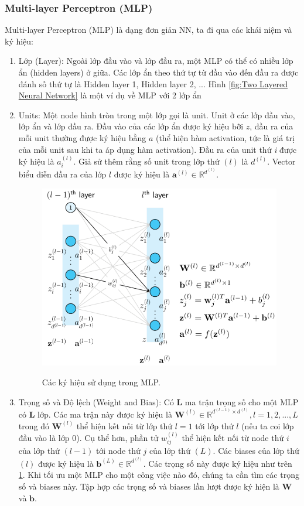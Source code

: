 \subsubsection{Multi-layer Perceptron (MLP)}
Multi-layer Perceptron (MLP) là dạng đơn giản NN, ta đi qua các khái niệm và ký hiệu:
\begin{enumerate}
	\item Lớp (Layer): Ngoài lớp đầu vào và lớp đầu ra, một MLP có thể có nhiều lớp ẩn (hidden layers) ở giữa. Các lớp ẩn theo thứ tự từ đầu vào đến đầu ra được đánh số thứ tự là Hidden layer 1, Hidden layer 2, ... Hình \eqref{fig:Two Layered Neural Network} là một ví dụ về MLP với 2 lớp ẩn
	\item Units: Một node hình tròn trong một lớp gọi là unit. Unit ở các lớp đầu vào, lớp ẩn và lớp đầu ra. Đầu vào của các lớp ẩn được ký hiệu bỡi $\textit{z}$, đầu ra của mỗi unit thường được ký hiệu bằng $\textit{a}$ (thể hiện hàm activation, tức là giá trị của mỗi unit sau khi ta áp dụng hàm activation). Đầu ra của unit thứ \textit{i} được ký hiệu là $a_{i}^{(l)}$. Giả sử thêm rằng số unit trong lớp thứ $(l)$ là $d^{(l)}$. Vector biểu diễn đầu ra của lớp $l$ được ký hiệu là $\textbf{a}^{(l)}\in \mathbb{R}^{d^{(l)}}$.
	\begin{figure}[h]
		\begin{center}
			\includegraphics[height=.58\textheight]{Chuong2/Figs/kyhieu.png}
			\label{fig:ky hieu trong MLP}
			\caption{Các ký hiệu sử dụng trong MLP.}
		\end{center}
	\end{figure}
	\item Trọng số và Độ lệch (Weight and Bias): Có $\textbf{L}$ ma trận trọng số cho một MLP có $\textbf{L}$ lớp. Các ma trận này được ký hiệu là $\textbf{W}^{(l)} \in \mathbb{R}^{d^{(l-1)} \times d^{(l)}},l = 1,2,...,L$ trong đó $\textbf{W}^{(l)}$ thể hiện kết nối từ lớp thứ $l=1$ tới lớp thứ $l$ (nếu ta coi lớp đầu vào là lớp 0). Cụ thể hơn, phần tử $w_{ij}^{(l)}$ thể hiện kết nối từ node thứ $i$ của lớp thứ $(l-1)$ tới node thứ $j$ của lớp thứ $(L)$. Các biases của lớp thứ $(l)$ được ký hiệu là $\textbf{b}^{(L)}\in \mathbb{R}^{d^{(l)}}$. Các trọng số này được ký hiệu như trên \ref{fig:ky hieu trong MLP}. Khi tối ưu một MLP cho một công việc nào đó, chúng ta cần tìm các trọng số và biases này. Tập hợp các trọng số và biases lần lượt được ký hiện là $\textbf{W}$ và $\textbf{b}$.

\end{enumerate}
